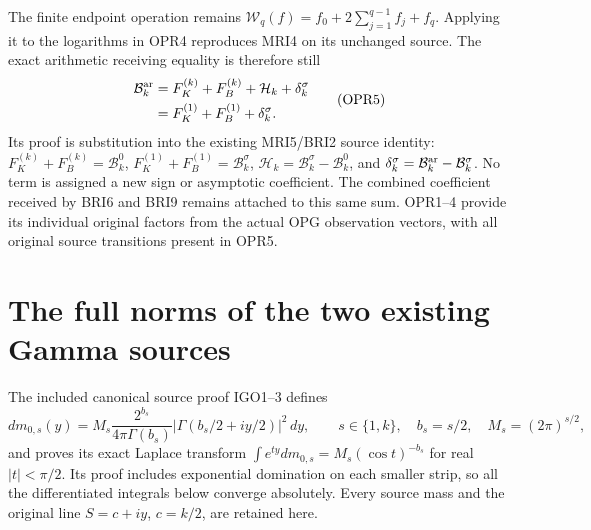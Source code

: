 \documentclass[11pt,a4paper]{article}
\begin{document}
The finite endpoint operation remains
$\mathcal W_q(f)=f_0+2\sum_{j=1}^{q-1}f_j+f_q$.
Applying it to the logarithms in OPR4 reproduces MRI4 on its
unchanged source. The exact arithmetic receiving equality is
therefore still
\[
\begin{aligned}
 \mathcal B_k^{\rm ar}
 &=F_K^{(k)}+F_B^{(k)}+\mathcal H_k+\delta_k^\sigma\\
 &=F_K^{(1)}+F_B^{(1)}+\delta_k^\sigma.
\end{aligned}\tag{OPR5}
\]
Its proof is substitution into the existing MRI5/BRI2 source
identity: $F_K^{(k)}+F_B^{(k)}=\mathcal B_k^0$,
$F_K^{(1)}+F_B^{(1)}=\mathcal B_k^\sigma$,
$\mathcal H_k=\mathcal B_k^\sigma-\mathcal B_k^0$, and
$\delta_k^\sigma=\mathcal B_k^{\rm ar}-\mathcal B_k^\sigma$.
No term is assigned a new sign or asymptotic coefficient.
The combined coefficient received by BRI6 and BRI9 remains
attached to this same sum. OPR1--4 provide its individual
original factors from the actual OPG observation vectors,
with all original source transitions present in OPR5.



\section{The full norms of the two existing Gamma sources}
\label{sec:OGN}

The included canonical source proof IGO1--3 defines
\[
 dm_{0,s}(y)=M_s\frac{2^{b_s}}{4\pi\Gamma(b_s)}
       |\Gamma(b_s/2+iy/2)|^2\,dy,
 \qquad s\in\{1,k\},\quad b_s=s/2,\quad M_s=(2\pi)^{s/2},
 \tag{OGN1}
\]
and proves its exact Laplace transform
$\int e^{ty}dm_{0,s}=M_s(\cos t)^{-b_s}$ for real $|t|<\pi/2$.
Its proof includes exponential domination on each smaller strip,
so all the differentiated integrals below converge absolutely.
Every source mass and the original line $S=c+iy$, $c=k/2$, are
retained here.
\end{document}
